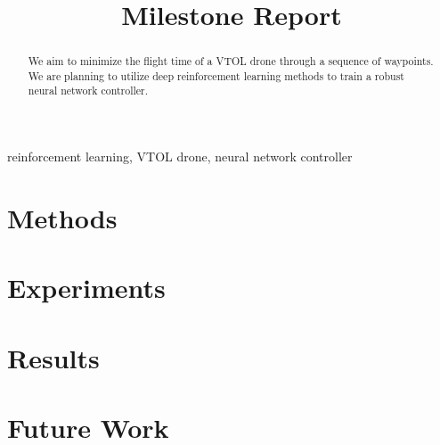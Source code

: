 \documentclass[conference]{IEEEtran}
\begin{document}
\title{Milestone Report}

\author{
\and
{}






}

\maketitle




\begin{abstract}
We aim to minimize the flight time of a VTOL drone through a sequence of waypoints. We are planning to utilize deep reinforcement learning methods to train a robust neural network controller.

\end{abstract}

\begin{IEEEkeywords}
reinforcement learning, VTOL drone, neural network controller
\end{IEEEkeywords}




\section{Methods}


\section{Experiments}


\section{Results}


\section{Future Work}









\end{document}
